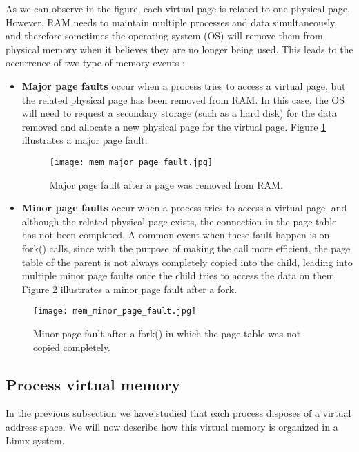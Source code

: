 As we can observe in the figure, each virtual page is related to one physical page. However, RAM needs to maintain multiple processes and data simultaneously, and therefore sometimes the operating system (OS) will remove them from physical memory when it believes they are no longer being used. This leads to the occurrence of two type of memory events \cite{page_faults}:
\begin{itemize}
\item \textbf{Major page faults} occur when a process tries to access a virtual page, but the related physical page has been removed from RAM. In this case, the OS will need to request a secondary storage (such as a hard disk) for the data removed and allocate a new physical page for the virtual page. Figure \ref{fig:mem_major_page_fault} illustrates a major page fault.
\begin{figure}[htbp]
	\centering
	\texttt{[image: mem\_major\_page\_fault.jpg]}
	\caption{Major page fault after a page was removed from RAM.}
	\label{fig:mem_major_page_fault}
\end{figure}
\item \textbf{Minor page faults} occur when a process tries to access a virtual page, and although the related physical page exists, the connection in the page table has not been completed. A common event when these fault happen is on fork() calls, since with the purpose of making the call more efficient, the page table of the parent is not always completely copied into the child, leading into multiple minor page faults once the child tries to access the data on them. Figure \ref{fig:mem_minor_page_fault} illustrates a minor page fault after a fork.
\end{itemize}
\begin{figure}[htbp]
	\centering
	\texttt{[image: mem\_minor\_page\_fault.jpg]}
	\caption{Minor page fault after a fork() in which the page table was not copied completely.}
	\label{fig:mem_minor_page_fault}
\end{figure}

\subsection{Process virtual memory}
In the previous subsection we have studied that each process disposes of a virtual address space. We will now describe how this virtual memory is organized in a Linux system.

